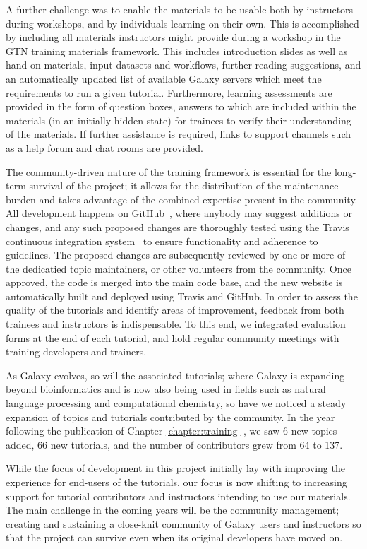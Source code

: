 A further challenge was to enable the materials to be usable both by instructors during workshops, and by individuals learning on their own. This is accomplished by including all materials instructors might provide during a workshop in the GTN training materials framework. This includes introduction slides as well as hand-on materials, input datasets and workflows, further reading suggestions, and an automatically updated list of available Galaxy servers which meet the requirements to run a given tutorial. Furthermore, learning assessments are provided in the form of question boxes, answers to which are included within the materials (in an initially hidden state) for trainees to verify their understanding of the materials. If further assistance is required, links to support channels such as a help forum and chat rooms are provided.

The community-driven nature of the training framework is essential for the long-term survival of the project; it allows for the distribution of the maintenance burden and takes advantage of the combined expertise present in the community. All development happens on GitHub~\cite{url-github}, where anybody may suggest additions or changes, and any such proposed changes are thoroughly tested using the Travis continuous integration system~\cite{travis-ci} to ensure functionality and adherence to guidelines. The proposed changes are subsequently reviewed by one or more of the dedicatied topic maintainers, or other volunteers from the community. Once approved, the code is merged into the main code base, and the new website is automatically built and deployed using Travis and GitHub. In order to assess the quality of the tutorials and identify areas of improvement, feedback from both trainees and instructors is indispensable. To this end, we integrated evaluation forms at the end of each tutorial, and hold regular community meetings with training developers and trainers.

As Galaxy evolves, so will the associated tutorials; where Galaxy is expanding beyond bioinformatics and is now also being used in fields such as natural language processing and computational chemistry, so have we noticed a steady expansion of topics and tutorials contributed by the community. In the year following the publication of Chapter \ref{chapter:training} , we saw 6 new topics added, 66 new tutorials, and the number of contributors grew from 64 to 137.

While the focus of development in this project initially lay with improving the experience for end-users of the tutorials, our focus is now shifting to increasing support for tutorial contributors and instructors intending to use our materials. The main challenge in the coming years will be the community management; creating and sustaining a close-knit community of Galaxy users and instructors so that the project can survive even when its original developers have moved on.


